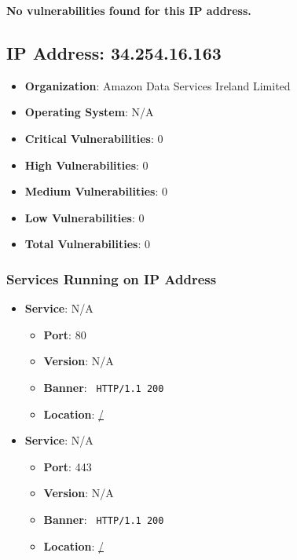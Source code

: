 \documentclass{article}
\begin{document}
\textbf{No vulnerabilities found for this IP address.}


\clearpage



\subsection*{IP Address: 34.254.16.163}

\begin{itemize}
    \item \textbf{Organization}: Amazon Data Services Ireland Limited
    \item \textbf{Operating System}:  N/A 
    \item \textbf{Critical Vulnerabilities}: 0
    \item \textbf{High Vulnerabilities}: 0
    \item \textbf{Medium Vulnerabilities}: 0
    \item \textbf{Low Vulnerabilities}: 0
    \item \textbf{Total Vulnerabilities}: 0
\end{itemize}

\subsubsection*{Services Running on IP Address}

\begin{itemize}
    
        \item \textbf{Service}: N/A
        \begin{itemize}
            \item \textbf{Port}: 80
            \item \textbf{Version}:  N/A 
            \item \textbf{Banner}: \texttt{ HTTP/1.1 200 
 }
            \item \textbf{Location}: \href{ / }{ / }
        \end{itemize}
    
        \item \textbf{Service}: N/A
        \begin{itemize}
            \item \textbf{Port}: 443
            \item \textbf{Version}:  N/A 
            \item \textbf{Banner}: \texttt{ HTTP/1.1 200 
 }
            \item \textbf{Location}: \href{ / }{ / }
        \end{itemize}
    
\end{itemize}
\end{document}
